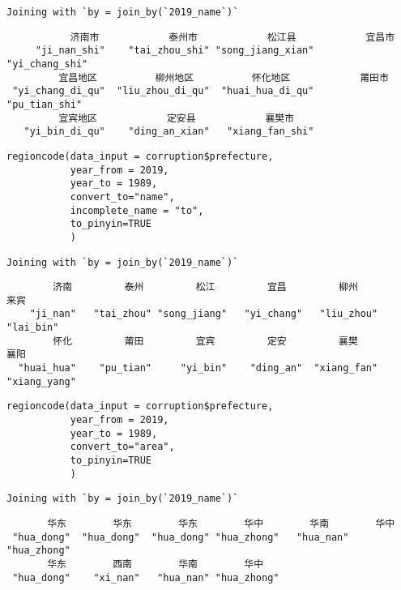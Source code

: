 \documentclass[
  article]{jss}
\begin{document}
\begin{verbatim}
Joining with `by = join_by(`2019_name`)`
\end{verbatim}

\begin{verbatim}
           济南市            泰州市            松江县            宜昌市 
     "ji_nan_shi"    "tai_zhou_shi" "song_jiang_xian"    "yi_chang_shi" 
         宜昌地区          柳州地区          怀化地区            莆田市 
 "yi_chang_di_qu"  "liu_zhou_di_qu"  "huai_hua_di_qu"     "pu_tian_shi" 
         宜宾地区            定安县            襄樊市 
   "yi_bin_di_qu"    "ding_an_xian"   "xiang_fan_shi" 
\end{verbatim}

\begin{verbatim}
regioncode(data_input = corruption$prefecture, 
           year_from = 2019,
           year_to = 1989, 
           convert_to="name",
           incomplete_name = "to",
           to_pinyin=TRUE
           )
\end{verbatim}

\begin{verbatim}
Joining with `by = join_by(`2019_name`)`
\end{verbatim}

\begin{verbatim}
        济南         泰州         松江         宜昌         柳州         来宾 
    "ji_nan"   "tai_zhou" "song_jiang"   "yi_chang"   "liu_zhou"    "lai_bin" 
        怀化         莆田         宜宾         定安         襄樊         襄阳 
  "huai_hua"    "pu_tian"     "yi_bin"    "ding_an"  "xiang_fan" "xiang_yang" 
\end{verbatim}

\begin{verbatim}
regioncode(data_input = corruption$prefecture, 
           year_from = 2019,
           year_to = 1989, 
           convert_to="area",
           to_pinyin=TRUE
           )
\end{verbatim}

\begin{verbatim}
Joining with `by = join_by(`2019_name`)`
\end{verbatim}

\begin{verbatim}
       华东        华东        华东        华中        华南        华中 
 "hua_dong"  "hua_dong"  "hua_dong" "hua_zhong"   "hua_nan" "hua_zhong" 
       华东        西南        华南        华中 
 "hua_dong"    "xi_nan"   "hua_nan" "hua_zhong" 
\end{verbatim}
\end{document}
